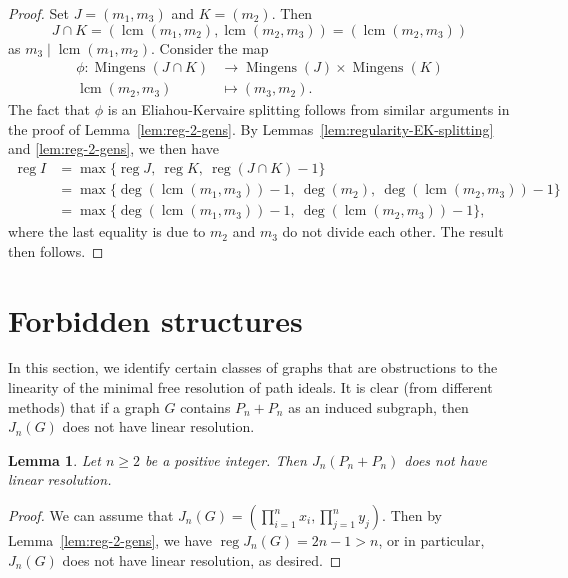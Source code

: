 \documentclass{amsart}
\newtheorem{lemma}[theorem]{Lemma}
\theoremstyle{remark}
\theoremstyle{definition}
\DeclareMathOperator{\reg}{reg}
\DeclareMathOperator{\lcm}{lcm}
\DeclareMathOperator{\mingens}{Mingens}
\begin{document}
	\begin{proof}
		Set $J=(m_1,m_3)$ and $K=(m_2)$. Then
		\[
		J\cap K = (\lcm(m_1,m_2),\lcm(m_2,m_3)) = (\lcm(m_2,m_3))
		\]
		as $m_3\mid \lcm(m_1,m_2)$. Consider the map
		\begin{align*}
			\phi\colon \mingens(J\cap K) &\to \mingens(J)\times \mingens(K)\\
			\lcm(m_2,m_3) &\mapsto (m_3,m_2).
		\end{align*}
		The fact that $\phi$ is an Eliahou-Kervaire splitting follows from similar arguments in the proof of Lemma~\ref{lem:reg-2-gens}. By Lemmas~\ref{lem:regularity-EK-splitting} and \ref{lem:reg-2-gens}, we then have
		\begin{align*}
			\reg I &= \max \{\reg J, \ \reg K, \ \reg(J\cap K) -1 \}\\
			&= \max \{\deg(\lcm(m_1,m_3)) -1, \ \deg(m_2), \ \deg(\lcm(m_2,m_3)) -1 \}\\
			&= \max \{\deg(\lcm(m_1,m_3)) -1, \ \deg(\lcm(m_2,m_3)) -1 \},
		\end{align*}
		where the last equality is due to $m_2$ and $m_3$ do not divide each other. The result then follows.
	\end{proof}

    
	
\section{Forbidden structures}\label{sec:forbidden}
	
	In this section, we identify certain classes of graphs that are obstructions to the linearity of the minimal free resolution of path ideals. It is clear (from different methods) that if a graph $G$ contains $P_n+P_n$ as an induced subgraph, then $J_n(G)$ does not have linear resolution.
	\begin{lemma}\label{lem:forbidden-Pn+Pn}
		Let $n\geq 2$ be a positive integer. Then $J_n(P_n+P_n)$ does not have linear resolution.
	\end{lemma}
	
	\begin{proof}
		We can assume that $J_n(G)= \left( \prod_{i=1}^n x_i, \prod_{j=1}^n y_j \right)$. Then by Lemma~\ref{lem:reg-2-gens}, we have $\reg J_n(G) = 2n -1 >n$, or in particular, $J_n(G)$ does not have linear resolution, as desired.
	\end{proof}
	
\end{document}
